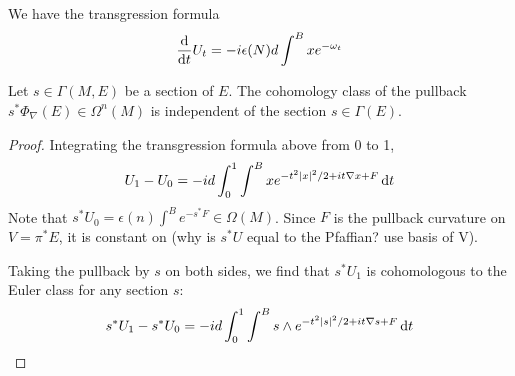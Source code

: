 \begin{comment} %
Let $E=P\times_\rho V$ be the associated bundle to $P$ with rank $2m$. 
basic forms on $P\times V$ are in correspondence with forms on  $E$.

A representative for the Thom class, called the Mathai-Quillen Thom form, is
given by
\begin{equation} \label{eq:mathai_quillen}
\Phi_\nabla(E) = \frac{1}{(2\pi)^m} e^{-v_a^2/2} \int \odif{\chi} 
\exp(\chi_a\Omega^{ab}\chi_b /2 + i\nabla v^a \chi_a)
\end{equation}
where $v^a \in \Omega^0(P\times V)$ are coordinates on $V$, and $\nabla v^a \in
\Omega^1(P\times V)$ is the exterior covariant derivative of $v^a$.
Not well defined globally, since using trivialisation to use coordinates? 

We claim that this defines a basic form in $\Omega^{2m}_\rho(P\times V)$,
and that it is a representative of the Thom class. 

To show that it is a basic form, we need to prove it is horizontal and $\rho$
equivariant.  

To show that is is a representative of the Thom class, we need to prove it is
closed and satisfies  $\pi^*\Phi_\nabla(E) = 1$.

Pullback by zero section is Pfaffian.
\end{comment} 

\begin{prop} %
	We have the transgression formula
	\[
	\odv{}{t} U_t = -i\epsilon(N) d\int^B x e^{-\omega_t}
	\] 
\end{prop}
\begin{prop} \label{prop:thom_pullback}
	Let $s\in \Gamma(M,E)$ be a section of $E$.
	The cohomology class of the pullback $s^*\Phi_\nabla(E) \in \Omega^{n}(M)$
	is independent of the section  $s\in\Gamma(E)$.
\end{prop}
\begin{proof}
	Integrating the transgression formula above from 0 to 1, 
	\[
		U_1 - U_0 = -id\int_0^1\int^B x e^{-t^2\abs{x}^2/2 +
		it\nabla x + F} \odif{t}
	\] 
	Note that $s^*U_0 = \epsilon(n)\int^B e^{-s^*F} \in \Omega(M)$. Since $F$ is
	the pullback curvature on $V = \pi^*E$, it is constant on 
	(why is $s^*U$ equal to the Pfaffian? use basis of V).

	Taking the pullback by $s$ on both sides, we find that $s^*U_1$ is
	cohomologous to the Euler class for any section $s$:  
	\[
		s^*U_1 - s^*U_0 = -id\int_0^1\int^B s\wedge e^{-t^2\abs{s}^2/2 +
		it\nabla s + F} \odif{t}
	\] 
\end{proof}




